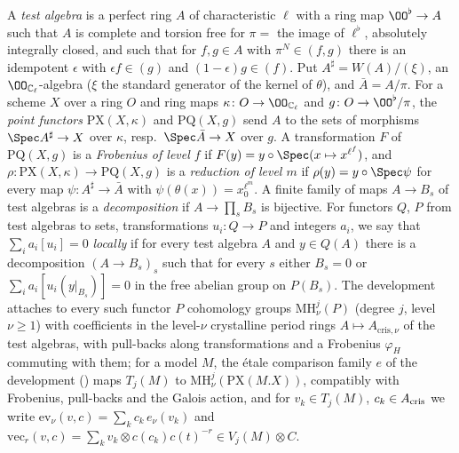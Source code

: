 \begin{definition}\label{pf:steps1:def:test}
A \emph{test algebra} is a perfect ring $A$ of characteristic $\ell$ with a ring map $\OO^\flat\to A$ such that $A$ is complete and
torsion free for $\pi=$ the image of $\ell^\flat$, absolutely integrally closed, and such that for $f,g\in A$ with $\pi^N\in(f,g)$ there
is an idempotent $\epsilon$ with $\epsilon f\in(g)$ and $(1-\epsilon)g\in(f)$. Put $A^\sharp=W(A)/(\xi)$, an $\OO_{\stepsICl}$-algebra
($\xi$ the standard generator of the kernel of $\theta$), and $\bar A=A/\pi$. For a scheme $X$ over a ring $O$ and ring maps
$\kappa\colon O\to\OO_{\stepsICl}$ and $g\colon O\to\OO^\flat/\pi$, the \emph{point functors} $\mathrm{PX}(X,\kappa)$ and
$\mathrm{PQ}(X,g)$ send $A$ to the sets of morphisms $\Spec A^\sharp\to X$ over $\kappa$, resp.\ $\Spec\bar A\to X$ over $g$. A
transformation $F$ of $\mathrm{PQ}(X,g)$ is a \emph{Frobenius of level $f$} if $F(y)=y\circ\Spec(x\mapsto x^{\ell^f})$, and
$\rho\colon\mathrm{PX}(X,\kappa)\to\mathrm{PQ}(X,g)$ is a \emph{reduction of level $m$} if $\rho(y)=y\circ\Spec\psi$ for every map
$\psi\colon A^\sharp\to\bar A$ with $\psi(\theta(x))=x_0^{\ell^m}$. A finite family of maps $A\to B_s$ of test algebras is a
\emph{decomposition} if $A\to\prod_sB_s$ is bijective. For functors $Q$, $P$ from test algebras to sets, transformations
$u_i\colon Q\to P$ and integers $a_i$, we say that $\sum_ia_i[u_i]=0$ \emph{locally} if for every test algebra $A$ and $y\in Q(A)$
there is a decomposition $(A\to B_s)_s$ such that for every $s$ either $B_s=0$ or $\sum_ia_i[u_i(y|_{B_s})]=0$ in the free abelian
group on $P(B_s)$. The development attaches to every such functor $P$ cohomology groups $\mathrm{MH}^j_\nu(P)$ (degree $j$, level
$\nu\ge1$) with coefficients in the level-$\nu$ crystalline period rings $A\mapsto A_{\mathrm{cris},\nu}$ of the test algebras,
with pull-backs along transformations and a Frobenius
$\varphi_H$ commuting with them; for a model $M$, the \'etale comparison family $e$ of the development
() maps $T_j(M)$ to $\mathrm{MH}^j_\nu(\mathrm{PX}(M.X))$, compatibly with
Frobenius, pull-backs and the Galois action, and for $v_k\in T_j(M)$, $c_k\in A_{\mathrm{cris}}$ we write
$\mathrm{ev}_\nu(v,c)=\sum_kc_k\,e_\nu(v_k)$ and $\mathrm{vec}_r(v,c)=\sum_kv_k\otimes c(c_k)c(t)^{-r}\in V_j(M)\otimes C$.
 
 
 
 
\end{definition}

